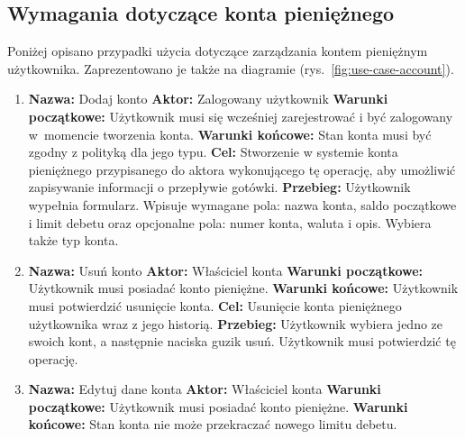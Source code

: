 \subsection{Wymagania dotyczące konta pieniężnego}
\label{subsec:wymagania-konto}
Poniżej opisano przypadki użycia dotyczące zarządzania kontem pieniężnym użytkownika. Zaprezentowano je także na diagramie (rys.~\ref{fig:use-case-account}).
\begin{enumerate}[labelwidth=1em,label=\arabic*.]
\item \textbf{Nazwa:} Dodaj konto \newline
    \textbf{Aktor:} Zalogowany użytkownik \newline
    \textbf{Warunki początkowe:} Użytkownik musi się wcześniej zarejestrować i być zalogowany w~momencie tworzenia konta. \newline
    \textbf{Warunki końcowe:} Stan konta musi być zgodny z polityką dla jego typu. \newline
    \textbf{Cel:} Stworzenie w systemie konta pieniężnego przypisanego do aktora wykonującego tę operację, aby umożliwić zapisywanie informacji o przepływie gotówki. \newline
    \textbf{Przebieg:} Użytkownik wypełnia formularz. Wpisuje wymagane pola: nazwa konta, saldo początkowe i limit debetu oraz opcjonalne pola: numer konta, waluta i opis. Wybiera także typ konta.
\item \textbf{Nazwa:} Usuń konto \newline
    \textbf{Aktor:} Właściciel konta \newline
    \textbf{Warunki początkowe:} Użytkownik musi posiadać konto pieniężne. \newline
    \textbf{Warunki końcowe:} Użytkownik musi potwierdzić usunięcie konta. \newline
    \textbf{Cel:} Usunięcie konta pieniężnego użytkownika wraz z jego historią. \newline
    \textbf{Przebieg:} Użytkownik wybiera jedno ze swoich kont, a następnie naciska guzik usuń. Użytkownik musi potwierdzić tę operację.
\item \textbf{Nazwa:} Edytuj dane konta \newline
    \textbf{Aktor:} Właściciel konta \newline
    \textbf{Warunki początkowe:} Użytkownik musi posiadać konto pieniężne. \newline
    \textbf{Warunki końcowe:} Stan konta nie może przekraczać nowego limitu debetu. \newline

\end{enumerate}
